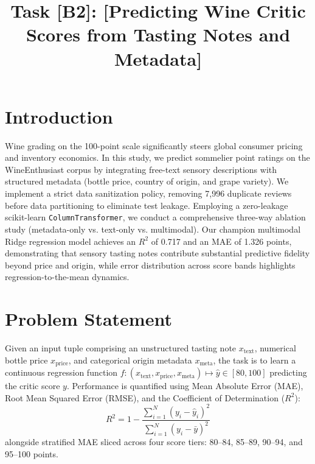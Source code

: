\documentclass[conference]{IEEEtran}
\begin{document}
\title{Task [B2]: [Predicting Wine Critic Scores from Tasting Notes and Metadata]}

\author{
}

\maketitle

\section{Introduction}
Wine grading on the 100-point scale significantly steers global consumer pricing and inventory economics. In this study, we predict sommelier point ratings on the WineEnthusiast corpus by integrating free-text sensory descriptions with structured metadata (bottle price, country of origin, and grape variety). We implement a strict data sanitization policy, removing 7,996 duplicate reviews before data partitioning to eliminate test leakage. Employing a zero-leakage scikit-learn \texttt{ColumnTransformer}, we conduct a comprehensive three-way ablation study (metadata-only vs. text-only vs. multimodal). Our champion multimodal Ridge regression model achieves an $R^2$ of 0.717 and an MAE of 1.326 points, demonstrating that sensory tasting notes contribute substantial predictive fidelity beyond price and origin, while error distribution across score bands highlights regression-to-the-mean dynamics.

\section{Problem Statement}
Given an input tuple comprising an unstructured tasting note $x_{\text{text}}$, numerical bottle price $x_{\text{price}}$, and categorical origin metadata $x_{\text{meta}}$, the task is to learn a continuous regression function $f: (x_{\text{text}}, x_{\text{price}}, x_{\text{meta}}) \mapsto \hat{y} \in [80, 100]$ predicting the critic score $y$. Performance is quantified using Mean Absolute Error (MAE), Root Mean Squared Error (RMSE), and the Coefficient of Determination ($R^2$):
\begin{equation}
R^2 = 1 - \frac{\sum_{i=1}^N (y_i - \hat{y}_i)^2}{\sum_{i=1}^N (y_i - \bar{y})^2}
\end{equation}
alongside stratified MAE sliced across four score tiers: 80--84, 85--89, 90--94, and 95--100 points.
\end{document}
